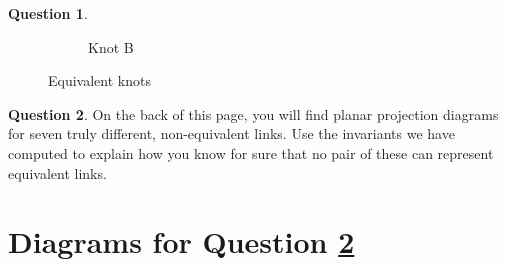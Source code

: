 \documentclass[12pt,letterpaper]{article}
\theoremstyle{definition}
\newtheorem{question}{Question}
\begin{document}
\begin{question}
\begin{figure}[h!]
\begin{subfigure}{.3\textwidth}
        \caption{Knot B}
    \end{subfigure}
    \caption{Equivalent knots}
    \label{fig:rm-pic}
\end{figure}
\end{question}

\vspace{.5cm}

\begin{question}\label{question:classify}
On the back of this page, you will find planar projection diagrams for seven truly different, non-equivalent links.
Use the invariants we have computed to explain how you know for sure that no pair of these can represent equivalent links.
\end{question}

\clearpage

\section*{Diagrams for Question \ref{question:classify}}
\end{document}
